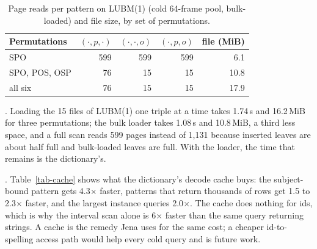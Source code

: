 \begin{table}[t]
\caption{Page reads per pattern on LUBM(1) (cold 64-frame pool, bulk-loaded) and file size, by set of permutations.}
\label{tab-permstudy}
\small
\begin{tabular}{@{}lrrrr@{}}
\toprule
Permutations & $(\cdot,p,\cdot)$ & $(\cdot,\cdot,o)$ & $(\cdot,p,o)$ & file (MiB) \\
\midrule
SPO & 599 & 599 & 599 & 6.1 \\
SPO, POS, OSP & 76 & 15 & 15 & 10.8 \\
all six & 76 & 15 & 15 & 17.9 \\
\bottomrule
\end{tabular}
\end{table}

.
Loading the 15 files of LUBM(1) one triple at a time takes 1.74\,s and 16.2\,MiB
for three permutations; the bulk loader takes 1.08\,s and 10.8\,MiB, a third
less space, and a full scan reads 599 pages instead of 1,131 because
inserted leaves are about half full and bulk-loaded leaves are full.
With the loader, the time that remains is the dictionary's.

.
Table~\ref{tab-cache} shows what the dictionary's decode cache buys:
the subject-bound pattern gets 4.3$\times$ faster, patterns that return
thousands of rows get 1.5 to 2.3$\times$ faster, and the largest instance
queries 2.0$\times$.
The cache does nothing for ids, which is why the
interval scan alone is 6$\times$ faster than the same query returning
strings.
A cache is the remedy Jena uses for the same cost; a cheaper id-to-spelling
access path would help every cold query and is future work.


